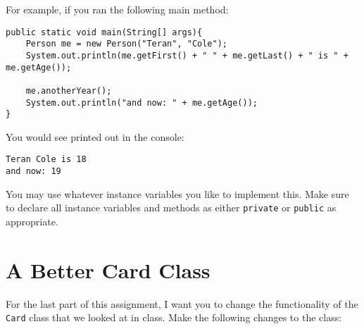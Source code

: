 \documentclass[11pt]{article}
\begin{document}
For example, if you ran the following main method:

\begin{verbatim}
public static void main(String[] args){
    Person me = new Person("Teran", "Cole");
    System.out.println(me.getFirst() + " " + me.getLast() + " is " + me.getAge());
		
    me.anotherYear();
    System.out.println("and now: " + me.getAge());
}
\end{verbatim}

You would see printed out in the console:

\begin{verbatim}
Teran Cole is 18
and now: 19
\end{verbatim}

You may use whatever instance variables you like to implement this.  Make sure to declare all instance variables and methods as either \texttt{private} or \texttt{public} as appropriate.

\section{A Better Card Class}

For the last part of this assignment, I want you to change the functionality of the \texttt{Card} class that we looked at in class. Make the following changes to the class:
\end{document}
